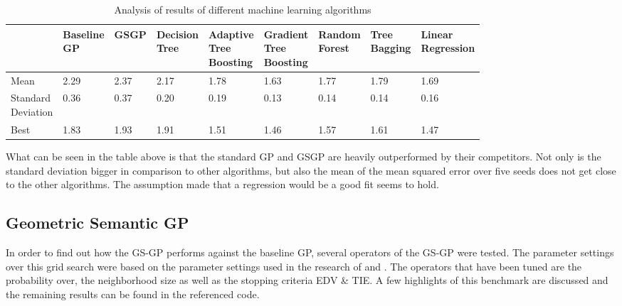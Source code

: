 \documentclass[12pt]{article}
\begin{document}
\begin{table}[h!]
\centering
\footnotesize
\begin{tabular}{l || l l l l l l l l}
 \hline
  & \shortstack{Baseline \\ GP} &  GSGP & \shortstack{Decision \\ Tree}  & \shortstack{Adaptive \\ Tree \\ Boosting} & \shortstack{Gradient \\ Tree \\ Boosting} & \shortstack{Random \\ Forest} & \shortstack{Tree \\ Bagging}& \shortstack{Linear \\ Regression}  \\
 \hline\hline
 Mean & \cellcolor{red!25}2.29 &  \cellcolor{red!25}2.37 & 2.17 & 1.78 & \cellcolor{green!25}1.63 & 1.77 & 1.79 & \cellcolor{green!25}1.69
 \\
 \shortstack{Standard \\ Deviation}  & \cellcolor{red!25}0.36 & \cellcolor{red!25}0.37 & 0.20 & 0.19 &\cellcolor{green!25}0.13 & \cellcolor{green!25}0.14 & \cellcolor{green!25}0.14 &0.16 \\
 Best &  \cellcolor{red!25}1.83 &  \cellcolor{red!25}1.93 & 1.91 & 1.51 & \cellcolor{green!25}1.46 & 1.57  &1.61 & \cellcolor{green!25}1.47 \\
 \hline
\end{tabular}
\label{Table to test captions and labels}
\caption{Analysis of results of different machine learning algorithms}
\label{table}
\end{table}


What can be seen in the table above is that the standard GP and GSGP are heavily outperformed by their competitors. Not only is the standard deviation bigger in comparison to other algorithms, but also the mean of the mean squared error over five seeds does not get close to the other algorithms. The assumption made that a regression would be a good fit seems to hold.

\subsection*{Geometric Semantic GP}

In order to find out how the GS-GP performs against the baseline GP, several operators of the GS-GP were tested.  The parameter settings over this grid search were based on the parameter settings used in the research of \cite{Goncalves} and \cite{castelli}.  The operators that have been tuned are the probability over, the neighborhood size as well as the stopping criteria EDV \& TIE.
A few highlights of this benchmark are discussed and the remaining results can be found in the referenced code.
\end{document}
